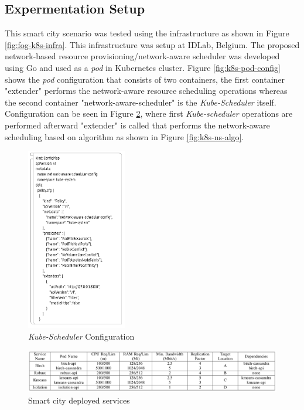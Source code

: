 \subsection{Expermentation Setup}
\label{sec:setup}
This smart city scenario was tested using the infrastructure as shown in Figure \ref{fig:fog-k8s-infra}. This infrastructure was setup at IDLab, Belgium\cite{Santos2019}. The proposed network-based resource provisioning/network-aware scheduler was developed using Go and used as a \emph{pod} in Kubernetes cluster\cite{Santos2019}. Figure \ref{fig:k8s-pod-config} shows the \emph{pod} configuration that consists of two containers, the first container "extender" performs the network-aware resource scheduling operations whereas the second container "network-aware-scheduler" is the \emph{Kube-Scheduler} itself\cite{Santos2019}. Configuration can be seen in Figure \ref{fig:k8s-sch-config}, where first \emph{Kube-scheduler} operations are performed afterward "extender" is called that performs the network-aware scheduling based on algorithm\cite{Santos2019} as shown in Figure \ref{fig:k8s-ns-algo}. \par
\begin{figure}
  \centering
  \includegraphics[width=\linewidth, height=8cm]{figures/mlcn-k8s-scheduler-config.pdf}
  \caption{\emph{Kube-Scheduler} Configuration\cite{Santos2019}}
  \label{fig:k8s-sch-config}
\end{figure}
\begin{figure}
  \includegraphics[width=\linewidth]{figures/mlcn-k8s-service-pods.pdf}
  \caption{Smart city deployed services\cite{Santos2019}}
  \label{fig:k8s-sch-config}
\end{figure}
